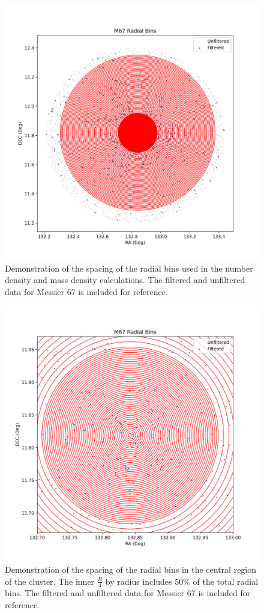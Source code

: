 \documentclass[onecolumn,table,xcdraw,super]{aastex631}
\begin{document}
\begin{figure}[]
    \centering
      \includegraphics[width=4.75in]{figures/M67_radialBins.png}
    \caption{Demonstration of the spacing of the radial bins used in the number density and mass density calculations. The filtered and unfiltered data for Messier 67 is included for reference.}
    \label{fig:radBins}
\end{figure}

\begin{figure}[]
    \centering
      \includegraphics[width=4.75in]{figures/M67_radialBins_center.png}
    \caption{Demonstration of the spacing of the radial bins in the central region of the cluster. The inner $\frac{R}{4}$ by radius includes 50\% of the total radial bins. The filtered and unfiltered data for Messier 67 is included for reference.}
    \label{fig:radBinsCenter}
\end{figure}
\end{document}
